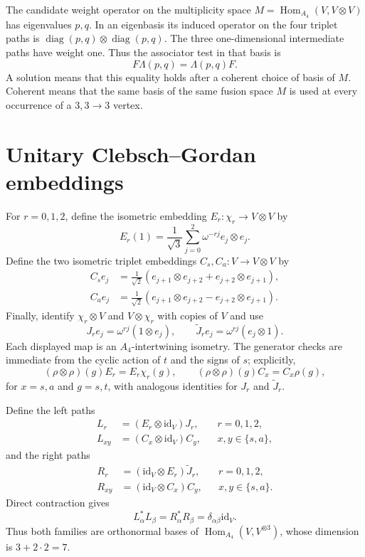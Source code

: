 \documentclass{article}
\newcommand{\Hom}{\operatorname{Hom}}
\newcommand{\id}{\mathrm{id}}
\newcommand{\diag}{\operatorname{diag}}
\begin{document}
The candidate weight operator on the multiplicity space
$M=\Hom_{A_4}(V,V\otimes V)$ has eigenvalues $p,q$. In an eigenbasis its
induced operator on the four triplet paths is
$\diag(p,q)\otimes\diag(p,q)$. The three one-dimensional intermediate paths
have weight one. Thus the associator test in that basis is
\[
F\Lambda(p,q)=\Lambda(p,q)F.
\]
A solution means that this equality holds after a coherent choice of basis of
$M$. Coherent means that the same basis of the same fusion space $M$ is used
at every occurrence of a $3,3\to3$ vertex.

\section{Unitary Clebsch--Gordan embeddings}

For $r=0,1,2$, define the isometric embedding
$E_r:\chi_r\to V\otimes V$ by
\[
E_r(1)=\frac1{\sqrt3}\sum_{j=0}^2\omega^{-rj}e_j\otimes e_j.
\]
Define the two isometric triplet embeddings $C_s,C_a:V\to V\otimes V$ by
\begin{align*}
C_s e_j&=\frac1{\sqrt2}
 (e_{j+1}\otimes e_{j+2}+e_{j+2}\otimes e_{j+1}),\\
C_a e_j&=\frac1{\sqrt2}
 (e_{j+1}\otimes e_{j+2}-e_{j+2}\otimes e_{j+1}).
\end{align*}
Finally, identify $\chi_r\otimes V$ and $V\otimes\chi_r$ with copies of $V$
and use
\[
J_r e_j=\omega^{rj}(1\otimes e_j),
\qquad
\widetilde J_r e_j=\omega^{rj}(e_j\otimes1).
\]
Each displayed map is an $A_4$-intertwining isometry. The generator checks
are immediate from the cyclic action of $t$ and the signs of $s$; explicitly,
\[
(\rho\otimes\rho)(g)E_r=E_r\chi_r(g),
\qquad
(\rho\otimes\rho)(g)C_x=C_x\rho(g),
\]
for $x=s,a$ and $g=s,t$, with analogous identities for $J_r$ and
$\widetilde J_r$.

Define the left paths
\begin{align*}
L_r&=(E_r\otimes\id_V)J_r, &&r=0,1,2,\\
L_{xy}&=(C_x\otimes\id_V)C_y, &&x,y\in\{s,a\},
\end{align*}
and the right paths
\begin{align*}
R_r&=(\id_V\otimes E_r)\widetilde J_r, &&r=0,1,2,\\
R_{xy}&=(\id_V\otimes C_x)C_y, &&x,y\in\{s,a\}.
\end{align*}
Direct contraction gives
\[
L_\alpha^*L_\beta=R_\alpha^*R_\beta
 =\delta_{\alpha\beta}\id_V.
\]
Thus both families are orthonormal bases of
$\Hom_{A_4}(V,V^{\otimes3})$, whose dimension is
$3+2\cdot2=7$.
\end{document}
